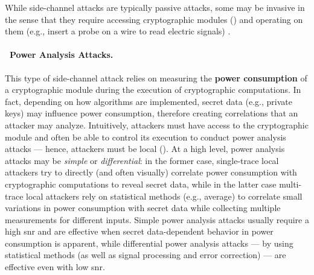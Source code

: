 While side-channel attacks are typically passive attacks, some may be invasive in the sense that they require accessing cryptographic modules () and operating on them (e.g., insert a probe on a wire to read electric signals) \cite{noauthor_power_2007}.


\paragraph*{\faBolt~Power Analysis Attacks.} This type of side-channel attack relies on measuring the \textbf{power consumption} of a cryptographic module during the execution of cryptographic computations. In fact, depending on how algorithms are implemented, secret data (e.g., private keys) may influence power consumption, therefore creating correlations that an attacker may analyze. Intuitively, attackers must have access to the cryptographic module and often be able to control its execution to conduct power analysis attacks \cite{messerges_investigations_1999} --- hence, attackers must be local (). At a high level, power analysis attacks may be \cite{goos_differential_1999,goos_towards_1999} \textit{simple} or \textit{differential}: in the former case, single-trace local attackers try to directly (and often visually) correlate power consumption with cryptographic computations to reveal secret data, while in the latter case multi-trace local attackers rely on statistical methods (e.g., average) to correlate small variations in power consumption with secret data while collecting multiple measurements for different inputs. Simple power analysis attacks usually require a high \gls{snr} and are effective when secret data-dependent behavior in power consumption is apparent, while differential power analysis attacks --- by using statistical methods (as well as signal processing and error correction) --- are effective even with low \gls{snr}.

